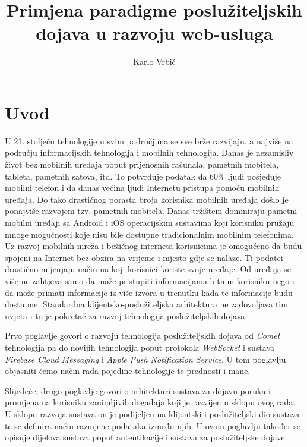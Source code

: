 \documentclass[times, utf8, zavrsni]{fer}
\begin{document}
\title{Primjena paradigme poslužiteljskih dojava u razvoju web-usluga}
\author{Karlo Vrbić}

\maketitle

\zahvala{}

\tableofcontents
\listoffigures

\chapter{Uvod}

U 21. stoljeću tehnologije u svim područjima se sve brže razvijaju, a najviše na području informacijskih tehnologija i mobilnih tehnologija. Danas je nezamisliv život bez mobilnih uređaja poput prijenosnih računala, pametnih mobitela, tableta, pametnih satova, itd. To potvrđuje podatak da 60\% ljudi posjeduje mobilni telefon i da danas većina ljudi Internetu pristupa pomoću mobilnih uređaja. Do tako drastičnog porasta broja korisnika mobilnih uređaja došlo je ponajviše razvojem tzv. pametnih mobitela. Danas tržištem dominiraju pametni mobilni uređaji sa Android i iOS operacijskim sustavima koji korisniku pružaju mnoge mogućnosti koje nisu bile dostupne tradicionalnim mobilnim telefonima. Uz razvoj mobilnih mreža i bežičnog interneta korisnicima je omogućeno da budu spojeni na Internet bez obzira na vrijeme i mjesto gdje se nalaze. Ti podatci drastično mijenjaju način na koji korisnici koriste svoje uređaje. Od uređaja se više ne zahtjeva samo da može pristupiti informacijama bitnim korisniku nego i da može primati informacije iz više izvora u trenutku kada te informacije budu dostupne. Standardna klijentsko-poslužiteljska arhitektura ne zadovoljava tim uvjeta i to je pokretač za razvoj tehnologija poslužiteljskih dojava.

Prvo poglavlje govori o razvoju tehnologija poslužiteljskih dojava od {\em Comet} tehnologija pa do novijih tehnologija poput protokola {\em WebSocket} i sustava {\em Firebase Cloud Messaging} i {\em Apple Push Notification Service}. U tom poglavlju objasniti ćemo način rada pojedine tehnologije te prednosti i mane.

Slijedeće, drugo poglavlje govori o arhitekturi sustava za dojavu poruka i promjena na korisniku zanimljivih događaja koji je razvijen u sklopu ovog rada. U sklopu razvoja sustava on je podijeljen na klijentski i poslužiteljski dio sustava te se definira način razmjene podataka između njih. U ovom poglavlju također se opisuje dijelova sustava poput autentikacije i sustava za poslužiteljske dojave.
\end{document}
